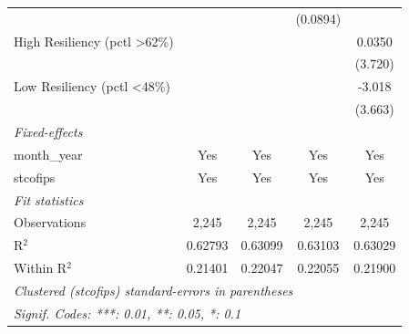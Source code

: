 \begin{tabular}{lcccc}
                                                          &                &                & (0.0894)       &   \\   
   High Resiliency (pctl >62\%)                           &                &                &                & 0.0350\\   
                                                          &                &                &                & (3.720)\\   
   Low Resiliency (pctl <48\%)                            &                &                &                & -3.018\\   
                                                          &                &                &                & (3.663)\\   
   \midrule
   \emph{Fixed-effects}\\
   month\_year                                            & Yes            & Yes            & Yes            & Yes\\  
   stcofips                                               & Yes            & Yes            & Yes            & Yes\\  
   \midrule
   \emph{Fit statistics}\\
   Observations                                           & 2,245          & 2,245          & 2,245          & 2,245\\  
   R$^2$                                                  & 0.62793        & 0.63099        & 0.63103        & 0.63029\\  
   Within R$^2$                                           & 0.21401        & 0.22047        & 0.22055        & 0.21900\\  
   \midrule \midrule
   \multicolumn{5}{l}{\emph{Clustered (stcofips) standard-errors in parentheses}}\\
   \multicolumn{5}{l}{\emph{Signif. Codes: ***: 0.01, **: 0.05, *: 0.1}}\\
\end{tabular}
\par\endgroup


